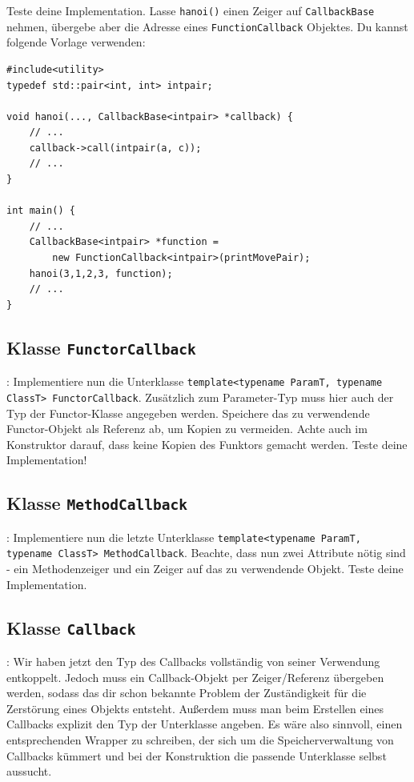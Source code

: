 Teste deine Implementation.
Lasse \lstinline{hanoi()} einen Zeiger auf \lstinline{CallbackBase} nehmen, übergebe aber die Adresse eines \lstinline{FunctionCallback} Objektes.
Du kannst folgende Vorlage verwenden:
\begin{lstlisting}
#include<utility>
typedef std::pair<int, int> intpair;

void hanoi(..., CallbackBase<intpair> *callback) {
	// ...
	callback->call(intpair(a, c));
	// ...
}

int main() {
	// ...
	CallbackBase<intpair> *function =
	    new FunctionCallback<intpair>(printMovePair);
	hanoi(3,1,2,3, function);
	// ...
}
\end{lstlisting}


\subsection{Klasse \lstinline{FunctorCallback}}:
Implementiere nun die Unterklasse \lstinline{template<typename ParamT, typename ClassT> FunctorCallback}.
Zusätzlich zum Parameter-Typ muss hier auch der Typ der Functor-Klasse angegeben werden.
Speichere das zu verwendende Functor-Objekt als Referenz ab, um Kopien zu vermeiden.
Achte auch im Konstruktor darauf, dass keine Kopien des Funktors gemacht werden.
Teste deine Implementation!



\subsection{Klasse \lstinline{MethodCallback}}:
Implementiere nun die letzte Unterklasse \lstinline{template<typename ParamT, typename ClassT> MethodCallback}.
Beachte, dass nun zwei Attribute nötig sind - ein Methodenzeiger und ein Zeiger auf das zu verwendende Objekt.
Teste deine Implementation.


\subsection{Klasse \lstinline{Callback}}:
Wir haben jetzt den Typ des Callbacks vollständig von seiner Verwendung entkoppelt.
Jedoch muss ein Callback-Objekt per Zeiger/Referenz übergeben werden, sodass das dir schon bekannte Problem der Zuständigkeit für die Zerstörung eines Objekts entsteht.
Außerdem muss man beim Erstellen eines Callbacks explizit den Typ der Unterklasse angeben.
Es wäre also sinnvoll, einen entsprechenden Wrapper zu schreiben, der sich um die Speicherverwaltung von Callbacks kümmert und bei der Konstruktion die passende Unterklasse selbst aussucht.

